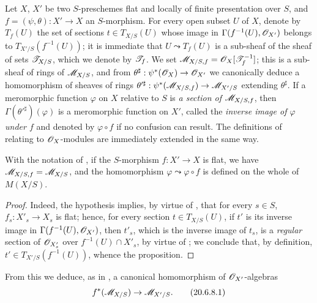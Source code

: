 \begin{env}[20.6.7]\label{IV.20.6.7}
Let $X$, $X'$ be two $S$-preschemes flat and locally of finite presentation over $S$, and $f=(\psi,\theta):X'\to X$ an $S$-morphism.
For every open subset $U$ of $X$, denote by $T_f(U)$ the set of sections $t\in T_{X/S}(U)$ whose image in $\Gamma(f^{-1}(U),\mathscr{O}_{X'})$ belongs to $T_{X'/S}(f^{-1}(U))$; it is immediate that $U\leadsto T_f(U)$ is a sub-sheaf of the sheaf of sets $\mathscr{T}_{X/S}$, which we denote by $\mathscr{T}_f$.
We set $\mathscr{M}_{X/S,f}=\mathscr{O}_X[\mathscr{T}_f^{-1}]$; this is a sub-sheaf of rings of $\mathscr{M}_{X/S}$, and from $\theta^\sharp: \psi^*(\mathscr{O}_X)\to\mathscr{O}_{X'}$ we canonically deduce a homomorphism of sheaves of rings $\theta'^\sharp: \psi^*(\mathscr{M}_{X/S,f})\to\mathscr{M}_{X'/S}$ extending $\theta^\sharp$.
If a meromorphic function $\varphi$ on $X$ relative to $S$ is \emph{a section of $\mathscr{M}_{X/S,f}$}, then $\Gamma(\theta'^\sharp)(\varphi)$ is a meromorphic function on $X'$, called the \emph{inverse image of $\varphi$ under $f$} and denoted by $\varphi\circ f$ if no confusion can result.
The definitions of  relating to $\mathscr{O}_X$-modules are immediately extended in the same way.
\end{env}

\begin{proposition}[20.6.8]
\label{IV.20.6.8}
With the notation of , if the $S$-morphism $f:X'\to X$ is flat, we have $\mathscr{M}_{X/S,f}=\mathscr{M}_{X/S}$, and the homomorphism $\varphi\leadsto\varphi\circ f$ is defined on the whole of $M(X/S)$.
\end{proposition}

\begin{proof}
Indeed, the hypothesis implies, by virtue of , that for every $s\in S$, $f_s:X'_s\to X_s$ is flat; hence, for every section $t\in T_{X/S}(U)$, if $t'$ is its inverse image in $\Gamma(f^{-1}(U),\mathscr{O}_{X'})$, then $t'_{s}$, which is the inverse image of $t_s$, is a \emph{regular} section of $\mathscr{O}_{X'_s}$ over $f^{-1}(U)\cap X'_s$, by virtue of ; we conclude that, by definition, $t'\in T_{X'/S}(f^{-1}(U))$, whence the proposition.
\end{proof}

From this we deduce, as in , a canonical homomorphism of $\mathscr{O}_{X'}$-algebras
\[
\label{IV.20.6.8.1}
  f^*(\mathscr{M}_{X/S})\to\mathscr{M}_{X'/S}.
  \tag{20.6.8.1}
\]

